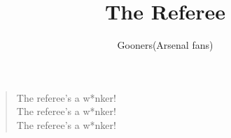 \documentclass[a4paper,12pt]{article}
\title{The Referee}
\author{Gooners(Arsenal fans)}
\date{}
\begin{document}
	
	\maketitle
	
	\begin{verse}
		
		The referee's a w*nker! \\
		The referee's a w*nker! \\
		The referee's a w*nker!
		
	\end{verse}
	
\end{document}
